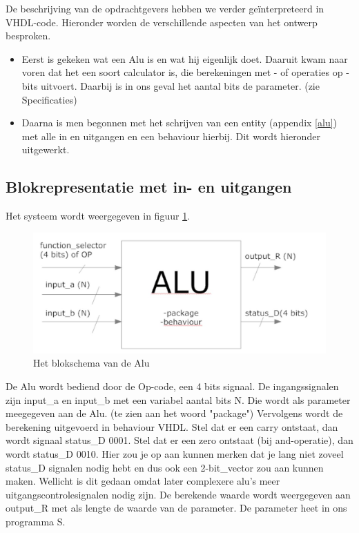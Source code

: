 \documentclass{article}
\begin{document}
De beschrijving van de opdrachtgevers hebben we verder geïnterpreteerd in VHDL-code. Hieronder worden de verschillende aspecten van het ontwerp besproken. 
\begin{itemize}
\item Eerst is gekeken wat een Alu is en wat hij eigenlijk doet. Daaruit kwam naar voren dat het een soort calculator is, die berekeningen met - of operaties op - bits uitvoert.  Daarbij is in ons geval het aantal bits de parameter. (zie Specificaties)

\item Daarna  is men begonnen met het schrijven van een entity (appendix \ref{alu}) met alle in en uitgangen en een behaviour hierbij. Dit wordt hieronder uitgewerkt.  
\end{itemize}
\subsection{Blokrepresentatie met in- en uitgangen}
Het systeem wordt weergegeven in figuur \ref{1}. 
\begin{figure} [h!]
\includegraphics [scale = .4]{figures/blk}
\caption{Het blokschema van de Alu}
\label{1}
\end{figure}
De Alu wordt bediend door de Op-code, een 4 bits signaal. De ingangssignalen zijn input\_a en input\_b met een variabel aantal bits N. Die wordt als parameter meegegeven aan de Alu. (te zien aan het woord "package") Vervolgens wordt de berekening uitgevoerd in behaviour VHDL. Stel dat er een carry ontstaat, dan wordt signaal status\_D 0001. Stel dat er een zero ontstaat (bij and-operatie), dan wordt status\_D 0010. Hier zou je op aan kunnen merken dat je lang niet zoveel status\_D signalen nodig hebt en dus ook een 2-bit\_vector zou aan kunnen maken. Wellicht is dit gedaan omdat later complexere alu's meer uitgangscontrolesignalen nodig zijn. De berekende waarde wordt weergegeven aan output\_R
met als lengte de waarde van de parameter. De parameter heet in ons programma S. 
\end{document}
